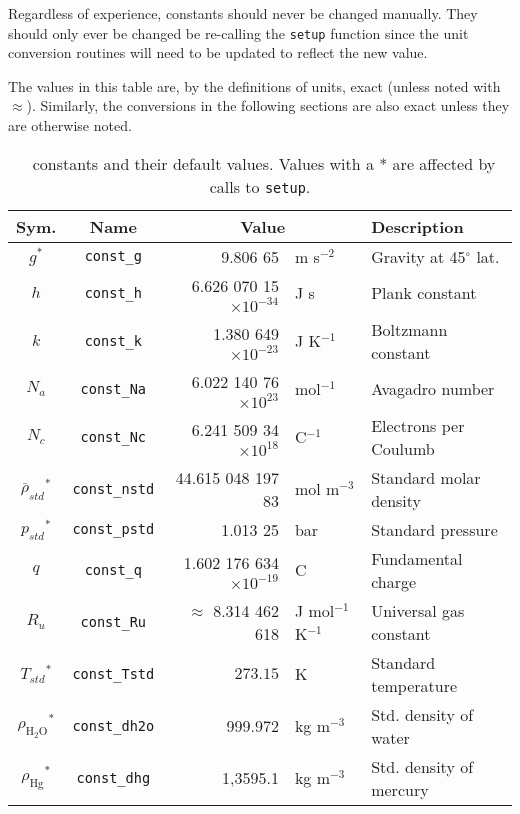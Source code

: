 Regardless of experience, constants should never be changed manually.  They should only ever be changed be re-calling the \verb|setup| function since the unit conversion routines will need to be updated to reflect the new value.

The values in this table are, by the definitions of units, exact (unless noted with $\approx$).  Similarly, the conversions in the following sections are also exact unless they are otherwise noted.

\begin{landscape}
\begin{table}[p]
\centering
\caption{\PM\ constants and their default values.  Values with a * are affected by calls to \texttt{setup}.}\label{tab:constants}
\small
\renewcommand{\arraystretch}{1.25}
\begin{tabular}{ccrll}
\hline
Sym. & Name & \multicolumn{2}{c}{Value} & Description \\
\hline
$g^*$ & \verb|const_g| & 9.806 65 & m s$^{-2}$ & Gravity at 45$^\circ$ lat.\\
$h$ & \verb|const_h| & 6.626 070 15$\times 10^{-34}$ & J s & Plank constant\\
$k$ & \verb|const_k| & 1.380 649 $\times 10^{-23}$ & J K$^{-1}$ & Boltzmann constant\\
$N_a$ & \verb|const_Na| & 6.022 140 76$\times 10^{23}$ & mol$^{-1}$ & Avagadro number\\
$N_c$ & \verb|const_Nc| & 6.241 509 34$\times 10^{18}$ & C$^{-1}$ & Electrons per Coulumb\\
$\overline{\rho}_{std}{^*}$ & \verb|const_nstd| & 44.615 048 197 83 & mol m$^{-3}$ & Standard molar density\\
$p_{std}{^*}$ & \verb|const_pstd| & 1.013 25 & bar & Standard pressure\\
$q$ & \verb|const_q| & 1.602 176 634 $\times 10^{-19}$ & C & Fundamental charge\\
$R_u$ & \verb|const_Ru| & $\approx$ 8.314 462 618 & J mol$^{-1}$ K$^{-1}$ & Universal gas constant\\
$T_{std}{^*}$ & \verb|const_Tstd| & $273.15$ & K & Standard temperature\\
$\rho_\mathrm{H_2O}{^*}$ & \verb|const_dh2o| & 999.972 & kg m$^{-3}$ & Std. density of water\\
$\rho_\mathrm{Hg}{^*}$ & \verb|const_dhg| & 1,3595.1 & kg m$^{-3}$ & Std. density of mercury\\
\hline
\end{tabular}
\renewcommand{\arraystretch}{1}
\end{table}
\end{landscape}


